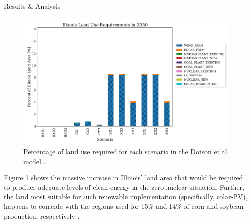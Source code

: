 \documentclass[final]{beamer}
\newlength{\onecolwid}
\newlength{\threecolwid}
\begin{document}
\begin{frame}[t]
\begin{columns}[t,totalwidth=\threecolwid]
\begin{column}{\onecolwid}
\begin{block}{Results \& Analysis}
\begin{figure}[ht] %
  \centering
  \includegraphics[scale=0.7]{land-use.png}
  \caption{Percentage of land use required for each scenario in the Dotson et al. model \cite{dotson}.}
  \label{fig:landuse}
\end{figure}

Figure \ref{fig:landuse} shows the massive increase in Illinois' land area that would be required to produce adequate levels of clean energy in the zero nuclear situation. Further, the land most suitable for such renewable implementation (specifically, solar-PV), happens to coincide with the regions used for 15\% and 14\% of corn and soybean production, respectively \cite{schleusener}.





\end{block}
\end{column}
\end{columns}
\end{frame}
\end{document}
